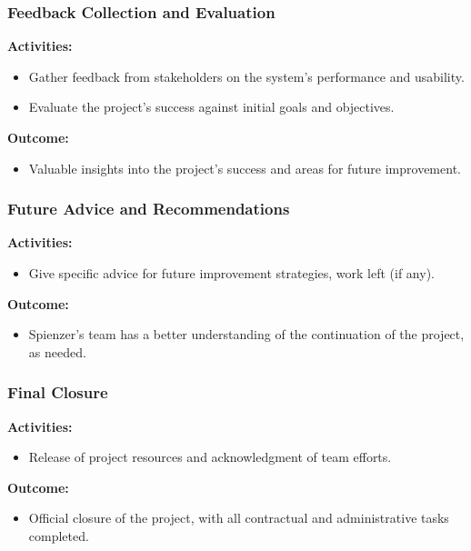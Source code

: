 \documentclass[12pt,a4paper]{article}
\begin{document}
\subsubsection{Feedback Collection and Evaluation}

\noindent \textbf{Activities:}
\begin{itemize}
    \item Gather feedback from stakeholders on the system's performance and usability.
    \item Evaluate the project's success against initial goals and objectives.
\end{itemize}

\noindent \textbf{Outcome:}
\begin{itemize}
    \item Valuable insights into the project's success and areas for future improvement.
\end{itemize}

\subsubsection{Future Advice and Recommendations}

\noindent \textbf{Activities:}
\begin{itemize}
    \item Give specific advice for future improvement strategies, work left (if any).
\end{itemize}

\noindent \textbf{Outcome:}
\begin{itemize}
    \item Spienzer’s team has a better understanding of the continuation of the project, as needed.
\end{itemize}

\subsubsection{Final Closure}

\noindent \textbf{Activities:}
\begin{itemize}
    \item Release of project resources and acknowledgment of team efforts.
\end{itemize}

\noindent \textbf{Outcome:}
\begin{itemize}
    \item Official closure of the project, with all contractual and administrative tasks completed.
\end{itemize}
\end{document}
